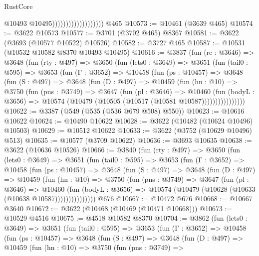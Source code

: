 \begin{lexlean}{RustCore}
\begin{coremodule}
                                          @10493
                                          @10495)))))))))))))))))))
    @465
@10573 := @10461 (@3639 @465)
@10574 := @3622 @10573
@10577 := @3701 (@3702 @465) @8367
@10581 := @3622 (@3693 (@10577 @10522) @10526)
@10582 := @3727 @465
@10587 := @10531 (@10532 @10582 @8370 @10493 @10495)
@10616 := @3837
    (fun (rc : @3646) =>
    @3648
      (fun (rty : @497) =>
      @3650
        (fun (lets0 : @3649) =>
        @3651
          (fun (tail0 : @595) =>
          @3653
            (fun (Γ : @3652) =>
            @10458
              (fun (ps : @10457) =>
              @3648
                (fun (S : @497) =>
                @3648
                  (fun (D : @497) =>
                  @10459
                    (fun (hn : @10) =>
                    @3750
                      (fun (pns : @3749) =>
                      @3647
                        (fun (pl : @3646) =>
                        @10460
                          (fun (bodyL : @3656) =>
                          @10574 (@10479 (@10505 (@10517 (@10581 @10587))))))))))))))))
@10622 := @3387 (@549 (@535 (@536 @679 @508) @550))
@10623 := @10616 @10622
@10624 := @10490 @10622
@10628 := @3622 (@10482 (@10624 @10496) @10503)
@10629 := @10512 @10622
@10633 := @3622 (@3752 (@10629 @10496) @513)
@10635 := @10577 (@3709 @10622)
@10636 := @3693 @10635
@10638 := @3622 (@10636 @10526)
@10666 := @3840
    (fun (rty : @497) =>
    @3650
      (fun (lets0 : @3649) =>
      @3651
        (fun (tail0 : @595) =>
        @3653
          (fun (Γ : @3652) =>
          @10458
            (fun (ps : @10457) =>
            @3648
              (fun (S : @497) =>
              @3648
                (fun (D : @497) =>
                @10459
                  (fun (hn : @10) =>
                  @3750
                    (fun (pns : @3749) =>
                    @3647
                      (fun (pl : @3646) =>
                      @10460
                        (fun (bodyL : @3656) =>
                        @10574 (@10479 (@10628 (@10633 (@10638 @10587)))))))))))))))
    @676
@10667 := @10472 @676
@10668 := @10667 @3640
@10672 := @3622 (@10468 (@10469 (@10471 @10668)))
@10673 := @10529 @4516
@10675 := @4518 @10582 @8370
@10704 := @3862
    (fun (lets0 : @3649) =>
    @3651
      (fun (tail0 : @595) =>
      @3653
        (fun (Γ : @3652) =>
        @10458
          (fun (ps : @10457) =>
          @3648
            (fun (S : @497) =>
            @3648
              (fun (D : @497) =>
              @10459
                (fun (hn : @10) =>
                @3750
                  (fun (pns : @3749) =>

\end{coremodule}
\end{lexlean}

